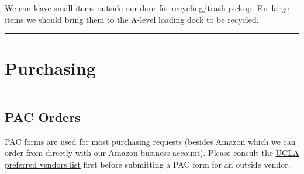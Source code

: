 \documentclass[
]{book}
\begin{document}
We can leave small items outside our door for recycling/trash pickup. For large items we should bring them to the A-level loading dock to be recycled.

\begin{center}\rule{0.5\linewidth}{0.5pt}\end{center}

\hypertarget{purchasing}{%
\section{Purchasing}\label{purchasing}}

\begin{center}\rule{0.5\linewidth}{0.5pt}\end{center}

\hypertarget{pac-orders}{%
\subsection{PAC Orders}\label{pac-orders}}

PAC forms are used for most purchasing requests (besides Amazon which we can order from directly with our Amazon business account). Please consult the \href{http://staff.purchasing.ucla.edu/Portal/app/agreements/agreementsummary.aspx}{UCLA preferred vendors list} first before submitting a PAC form for an outside vendor.
\end{document}
